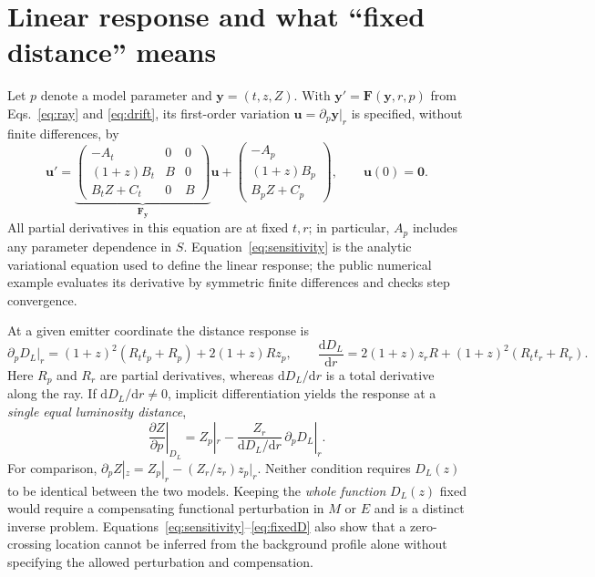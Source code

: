 \documentclass[11pt]{article}
\newcommand{\dd}{\mathrm d}
\newcommand{\D}{D_{\!L}}
\begin{document}
\section{Linear response and what ``fixed distance'' means}
Let $p$ denote a model parameter and $\bm y=(t,z,Z)$. With $\bm y'=\bm F(\bm y,r,p)$ from Eqs.~\eqref{eq:ray} and \eqref{eq:drift}, its first-order variation $\bm u=\partial_p\bm y|_r$ is specified, without finite differences, by
\begin{equation}
\bm u'=\underbrace{\begin{pmatrix}
-A_t&0&0\\(1+z)B_t&B&0\\ B_tZ+C_t&0&B
\end{pmatrix}}_{\bm F_{\bm y}}\bm u+
\begin{pmatrix}-A_p\\(1+z)B_p\\B_pZ+C_p\end{pmatrix},\qquad \bm u(0)=\bm0.\label{eq:sensitivity}
\end{equation}
All partial derivatives in this equation are at fixed $t,r$; in particular, $A_p$ includes any parameter dependence in $S$. Equation~\eqref{eq:sensitivity} is the analytic variational equation used to define the linear response; the public numerical example evaluates its derivative by symmetric finite differences and checks step convergence.

At a given emitter coordinate the distance response is
\begin{equation}
\partial_p\D|_r=(1+z)^2(R_t t_p+R_p)+2(1+z)Rz_p,
\qquad
\frac{\dd\D}{\dd r}=2(1+z)z_rR+(1+z)^2(R_t t_r+R_r).\label{eq:Dderivs}
\end{equation}
Here $R_p$ and $R_r$ are partial derivatives, whereas $\dd\D/\dd r$ is a total derivative along the ray. If $\dd\D/\dd r\ne0$, implicit differentiation yields the response at a \emph{single equal luminosity distance},
\begin{equation}
\boxed{\left.\frac{\partial Z}{\partial p}\right|_{\D}=Z_p|_r-\frac{Z_r}{\dd\D/\dd r}\,\partial_p\D|_r.}\label{eq:fixedD}
\end{equation}
For comparison, $\partial_p Z|_z=Z_p|_r-(Z_r/z_r)z_p|_r$. Neither condition requires $\D(z)$ to be identical between the two models. Keeping the \emph{whole function} $\D(z)$ fixed would require a compensating functional perturbation in $M$ or $E$ and is a distinct inverse problem. Equations~\eqref{eq:sensitivity}--\eqref{eq:fixedD} also show that a zero-crossing location cannot be inferred from the background profile alone without specifying the allowed perturbation and compensation.
\end{document}

